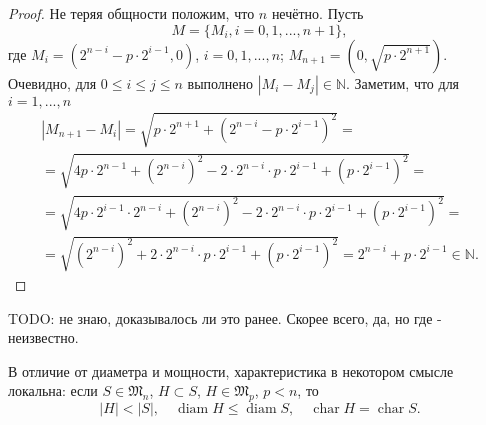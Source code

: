 \begin{proof}
	Не теряя общности положим, что $n$ нечётно.
	Пусть
	\begin{equation*}
		M = \{M_i, i =0,1,...,n+1\},
	\end{equation*}
	где
	$M_i = (2^{n-i}-p\cdot 2^{i-1},0)$, $i=0,1,...,n$;
	$M_{n+1} = (0,\sqrt{p \cdot 2^{n+1}})$.
	Очевидно, для $0\leqslant i \leqslant j \leqslant n$ выполнено
	$|M_i- M_j|\in\mathbb{N}$.
	Заметим, что для $i=1,...,n$
	\begin{multline*}
		|M_{n+1} - M_i| =
		\sqrt{p\cdot 2^{n+1} + (2^{n-i}-p\cdot2^{i-1})^2}
		=
		\\=
		\sqrt{4p\cdot 2^{n-1} + (2^{n-i})^2 - 2 \cdot 2^{n-i} \cdot p \cdot 2^{i-1} + (p\cdot 2^{i-1})^2}
		=
		\\=
		\sqrt{4p\cdot 2^{i-1} \cdot 2^{n-i} + (2^{n-i})^2 - 2 \cdot 2^{n-i} \cdot p \cdot 2^{i-1} + (p\cdot 2^{i-1})^2}
		=
		\\=
		\sqrt{(2^{n-i})^2 + 2 \cdot 2^{n-i} \cdot p \cdot 2^{i-1} + (p\cdot 2^{i-1})^2}
		=
		2^{n-i} + p\cdot 2^{i-1}
		\in\mathbb{N}
		.
	\end{multline*}
\end{proof}

TODO: не знаю, доказывалось ли это ранее. Скорее всего, да, но где - неизвестно.


В отличие от диаметра и мощности, характеристика в некотором смысле локальна:
если $S\in\mathfrak{M}_n$, $H \subset S$, $H\in\mathfrak{M}_{p}$, $p<n$,
то
\begin{equation*}
	|H| < |S|, \quad \operatorname{diam} H \leq \operatorname{diam} S, \quad \operatorname{char} H = \operatorname{char} S
	.
\end{equation*}
